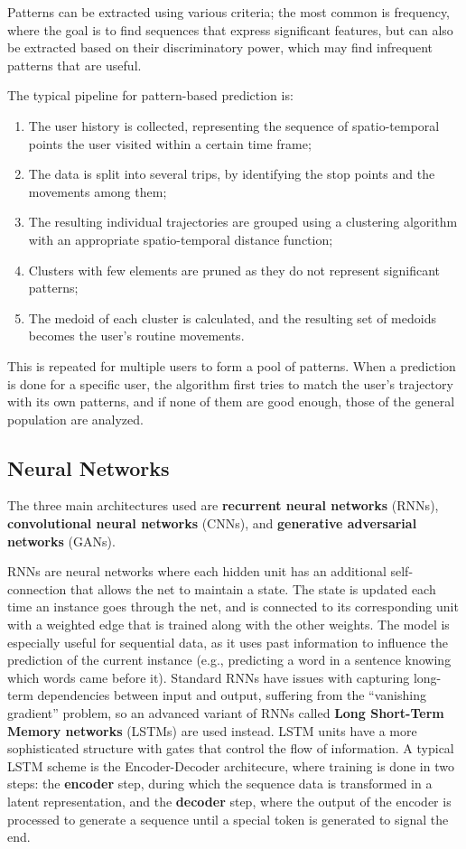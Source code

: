 Patterns can be extracted using various criteria; the most common is frequency, where the goal is to find sequences that express significant features, but can also be extracted based on their discriminatory power, which may find infrequent patterns that are useful.

The typical pipeline for pattern-based prediction is:
\begin{enumerate}[noitemsep]
    \item The user history is collected, representing the sequence of spatio-temporal points the user visited within a certain time frame;
    \item The data is split into several trips, by identifying the stop points and the movements among them;
    \item The resulting individual trajectories are grouped using a clustering algorithm with an appropriate spatio-temporal distance function;
    \item Clusters with few elements are pruned as they do not represent significant patterns;
    \item The medoid of each cluster is calculated, and the resulting set of medoids becomes the user's routine movements.
\end{enumerate}
This is repeated for multiple users to form a pool of patterns. When a prediction is done for a specific user, the algorithm first tries to match the user's trajectory with its own patterns, and if none of them are good enough, those of the general population are analyzed.

\subsection{Neural Networks}

The three main architectures used are \textbf{recurrent neural networks} (RNNs), \textbf{convolutional neural networks} (CNNs), and \textbf{generative adversarial networks} (GANs).

RNNs are neural networks where each hidden unit has an additional self-connection that allows the net to maintain a state. The state is updated each time an instance goes through the net, and is connected to its corresponding unit with a weighted edge that is trained along with the other weights. The model is especially useful for sequential data, as it uses past information to influence the prediction of the current instance (e.g., predicting a word in a sentence knowing which words came before it). Standard RNNs have issues with capturing long-term dependencies between input and output, suffering from the ``vanishing gradient'' problem, so an advanced variant of RNNs called \textbf{Long Short-Term Memory networks} (LSTMs) are used instead. LSTM units have a more sophisticated structure with gates that control the flow of information. A typical LSTM scheme is the Encoder-Decoder architecure, where training is done in two steps: the \textbf{encoder} step, during which the sequence data is transformed in a latent representation, and the \textbf{decoder} step, where the output of the encoder is processed to generate a sequence until a special token is generated to signal the end.

